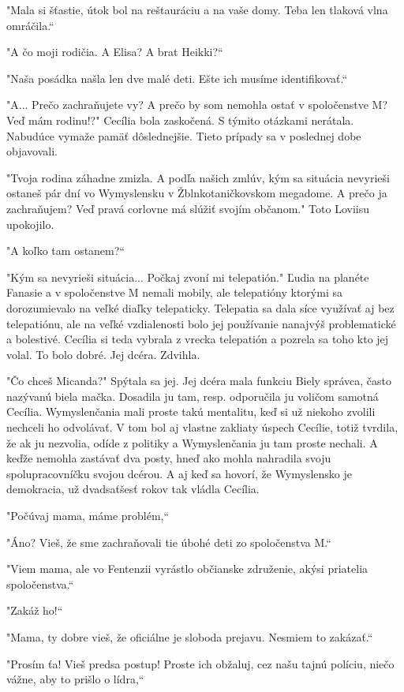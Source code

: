\documentclass{book}
\begin{document}
"Mala si šťastie, útok bol na reštauráciu a na vaše domy. Teba len tlaková vlna omráčila.“

"$ $A čo moji rodičia. A Elisa? A brat Heikki?“

"Naša posádka našla len dve malé deti. Ešte ich musíme identifikovať.“

"$ $A... Prečo zachraňujete vy? A prečo by som nemohla ostať v spoločenstve M? Veď mám rodinu!?"$ $ Cecília bola zaskočená. S týmito otázkami nerátala. Nabudúce vymaže pamäť dôslednejšie. Tieto prípady sa v poslednej dobe objavovali.

"Tvoja rodina záhadne zmizla. A podľa našich zmlúv, kým sa situácia nevyrieši ostaneš pár dní vo Wymyslensku v Žblnkotaničkovskom megadome. A prečo ja zachraňujem? Veď pravá corlovne má slúžiť svojím občanom."$ $ Toto Loviisu upokojilo.

"$ $A koľko tam ostanem?“

"Kým sa nevyrieši situácia... Počkaj zvoní mi telepatión."$ $ Ľudia na planéte Fanasie a v spoločenstve M nemali mobily, ale telepatióny ktorými sa dorozumievalo na veľké diaľky telepaticky. Telepatia sa dala síce využívať aj bez telepatiónu, ale na veľké vzdialenosti bolo jej používanie nanajvýš problematické a bolestivé. Cecília si teda vybrala z vrecka telepatión a pozrela sa toho kto jej volal. To bolo dobré. Jej dcéra. Zdvihla. 

"Čo chceš Micanda?"$ $ Spýtala sa jej. Jej dcéra mala funkciu Biely správca, často nazývanú biela mačka. Dosadila ju tam, resp. odporučila ju voličom samotná Cecília. Wymyslenčania mali proste takú mentalitu, keď si už niekoho zvolili nechceli ho odvolávať. V tom bol aj vlastne zakliaty úspech Cecílie, totiž tvrdila, že ak ju nezvolia, odíde z politiky a Wymyslenčania ju tam proste nechali. A keďže nemohla zastávať dva posty, hneď ako mohla nahradila svoju spolupracovníčku svojou dcérou. A aj keď sa hovorí, že Wymyslensko je demokracia, už dvadsaťšesť rokov tak vládla Cecília.

"Počúvaj mama, máme problém,“

"Áno? Vieš, že sme zachraňovali tie úbohé deti zo spoločenstva M.“

"Viem mama, ale vo Fentenzii vyrástlo občianske združenie, akýsi priatelia spoločenstva.“

"Zakáž ho!“

"Mama, ty dobre vieš, že oficiálne je sloboda prejavu. Nesmiem to zakázať.“

"Prosím ťa! Vieš predsa postup! Proste ich obžaluj, cez našu tajnú políciu, niečo vážne, aby to prišlo o lídra,“
\end{document}
